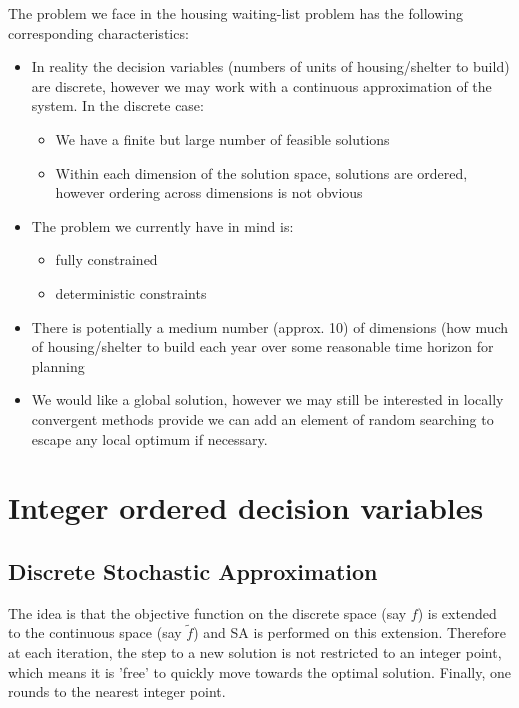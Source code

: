 \documentclass{article}
\begin{document}
The problem we face in the housing waiting-list problem has the following corresponding characteristics:
\begin{itemize}
  \item In reality the decision variables (numbers of units of housing/shelter to build) are discrete, however we may work with a continuous approximation of the system. In the discrete case:
  \begin{itemize}
    \item We have a finite but large number of feasible solutions
    \item Within each dimension of the solution space, solutions are ordered, however ordering across dimensions is not obvious
  \end{itemize}
  \item The problem we currently have in mind is:
  \begin{itemize}
    \item fully constrained
    \item deterministic constraints  
  \end{itemize}
  \item There is potentially a medium number (approx. 10) of dimensions (how much of housing/shelter to build each year over some reasonable time horizon for planning
  \item We would like a global solution, however we may still be interested in locally convergent methods provide we can add an element of random searching to escape any local optimum if necessary. 
\end{itemize}

\newpage

\section{Integer ordered decision variables}

\subsection{Discrete Stochastic Approximation}

The idea is that the objective function on the discrete space (say $f$) is extended to the continuous space (say $\tilde{f}$) and SA is performed on this extension. Therefore at each iteration, the step to a new solution is not restricted to an integer point, which means it is 'free' to quickly move towards the optimal solution. Finally, one rounds to the nearest integer point. \newline
\end{document}

